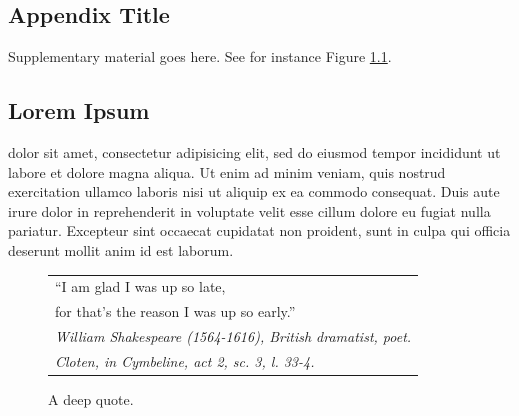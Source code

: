 
\appendix
\begin{center}
\chapter{Appendix Title}
\end{center}



Supplementary material goes here. See for instance Figure
\ref{fig:quote}.

\section{Lorem Ipsum}

dolor sit amet, consectetur adipisicing elit, sed do eiusmod tempor
incididunt ut labore et dolore magna aliqua. Ut enim ad minim veniam,
quis nostrud exercitation ullamco laboris nisi ut aliquip ex ea
commodo consequat. Duis aute irure dolor in reprehenderit in voluptate
velit esse cillum dolore eu fugiat nulla pariatur. Excepteur sint
occaecat cupidatat non proident, sunt in culpa qui officia deserunt
mollit anim id est laborum.

\begin{figure}
  \centering
  \begin{tabular}{l}
    ``I am glad I was up so late,\\
    \quad{}for that's the reason I was up so early.''\\
    \em \footnotesize William Shakespeare (1564-1616), British
    dramatist, poet.\\
    \em \footnotesize Cloten, in Cymbeline, act 2, sc. 3, l. 33-4.
  \end{tabular}
  \caption{A deep quote.}
  \label{fig:quote}
\end{figure}


